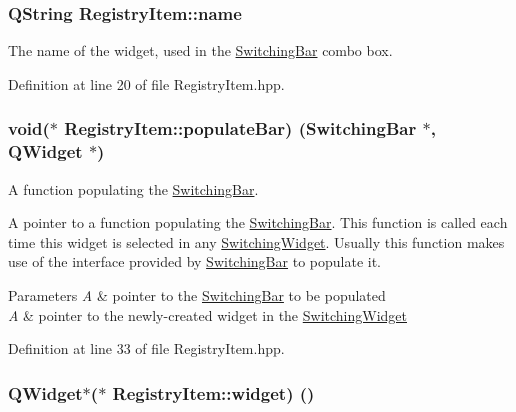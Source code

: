 \subsubsection[{\texorpdfstring{name}{name}}]{\setlength{\rightskip}{0pt plus 5cm}Q\+String Registry\+Item\+::name}\hypertarget{class_registry_item_a662d7e2c473bea72a0549caf63ea5bfd}{}\label{class_registry_item_a662d7e2c473bea72a0549caf63ea5bfd}
The name of the widget, used in the \hyperlink{class_switching_bar}{Switching\+Bar} combo box. 

Definition at line 20 of file Registry\+Item.\+hpp.

\subsubsection[{\texorpdfstring{populate\+Bar}{populateBar}}]{\setlength{\rightskip}{0pt plus 5cm}void($\ast$ Registry\+Item\+::populate\+Bar) ({\bf Switching\+Bar} $\ast$, Q\+Widget $\ast$)}\hypertarget{class_registry_item_a0784869b48c86a581e12c88fd2706cd0}{}\label{class_registry_item_a0784869b48c86a581e12c88fd2706cd0}


A function populating the \hyperlink{class_switching_bar}{Switching\+Bar}. 

A pointer to a function populating the \hyperlink{class_switching_bar}{Switching\+Bar}. This function is called each time this widget is selected in any \hyperlink{class_switching_widget}{Switching\+Widget}. Usually this function makes use of the interface provided by \hyperlink{class_switching_bar}{Switching\+Bar} to populate it. 
\begin{DoxyParams}{Parameters}
{\em A} & pointer to the \hyperlink{class_switching_bar}{Switching\+Bar} to be populated \\
\hline
{\em A} & pointer to the newly-\/created widget in the \hyperlink{class_switching_widget}{Switching\+Widget} \\
\hline
\end{DoxyParams}


Definition at line 33 of file Registry\+Item.\+hpp.

\subsubsection[{\texorpdfstring{widget}{widget}}]{\setlength{\rightskip}{0pt plus 5cm}Q\+Widget$\ast$($\ast$ Registry\+Item\+::widget) ()}\hypertarget{class_registry_item_aa95c5a5dbfdf491e53b07dbc0a027e14}{}\label{class_registry_item_aa95c5a5dbfdf491e53b07dbc0a027e14}


